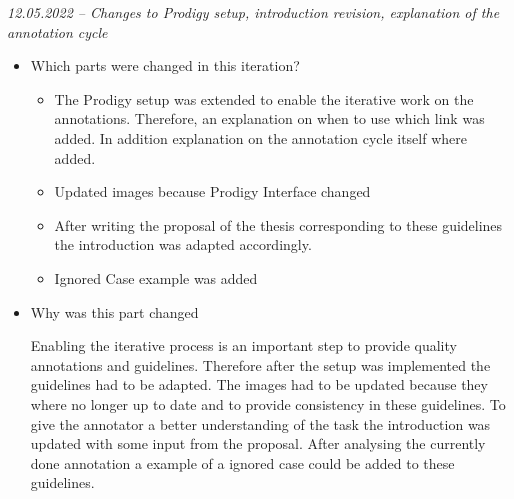 \documentclass{article}
\begin{document}
\begin{mdframed}
\emph{12.05.2022 – Changes to Prodigy setup, introduction revision, explanation of the annotation cycle }
\begin{itemize}
	\item Which parts were changed in this iteration? 
	\begin{itemize}
	    \item The Prodigy setup was extended to enable the iterative work on the annotations. Therefore, an explanation on when to use which link was added. In addition explanation on the annotation cycle itself where added.
	    \item Updated images because Prodigy Interface changed
	    \item After writing the proposal of the thesis corresponding to these guidelines the introduction was adapted accordingly.
	    \item Ignored Case example was added
	\end{itemize} 
    \item Why was this part changed
    
    Enabling the iterative process is an important step to provide quality annotations and guidelines. Therefore after the setup was implemented the guidelines had to be adapted. The images had to be updated because they where no longer up to date and to provide consistency in these guidelines. To give the annotator a better understanding of the task the introduction was updated with some input from the proposal. After analysing the currently done annotation a example of a ignored case could be added to these guidelines.
    
\end{itemize}
\end{mdframed}


\pagebreak

\listoffigures
\end{document}

